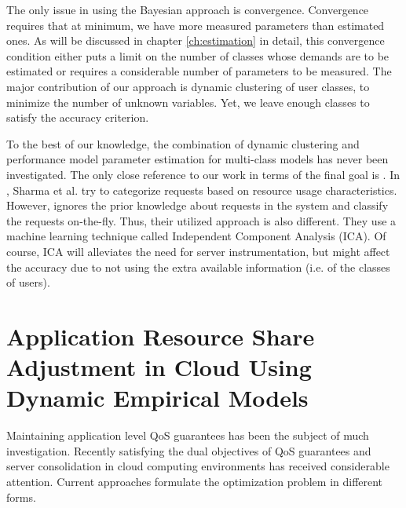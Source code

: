         The only issue in using the Bayesian approach is convergence. Convergence requires that at minimum, we have more measured parameters than estimated ones. As will be discussed in chapter \ref{ch:estimation} in detail, this convergence condition either puts a limit on the number of classes whose demands are to be estimated or requires a considerable number of parameters to be measured. The major contribution of our approach is dynamic clustering of user
  classes, to minimize the number of unknown variables. Yet, we leave enough classes to satisfy the accuracy criterion.  

  To the best of our knowledge, the combination of dynamic clustering and performance model parameter estimation for multi-class models has never been investigated. The only close reference to our work in terms of the final goal is \cite{sharma_automatic_2008}. 
In \cite{sharma_automatic_2008}, Sharma et al. try to categorize requests based on resource usage characteristics. However, \cite{sharma_automatic_2008} ignores the prior knowledge about requests in the system and classify the requests on-the-fly. Thus, their utilized approach is also different. They use a machine learning technique called Independent Component Analysis (ICA). Of course, ICA will alleviates the need for server instrumentation, but might affect the accuracy due to not using the extra available information (i.e. of the classes of users).


\section{Application Resource Share Adjustment in Cloud Using Dynamic Empirical Models}      
\label{sec:application_resource_share_optimization_private_cloud}

Maintaining application level QoS  guarantees has been the
subject of much investigation. Recently satisfying the dual objectives of
QoS guarantees and server consolidation in cloud computing environments has
received considerable attention. Current approaches formulate the optimization
problem in different forms.

